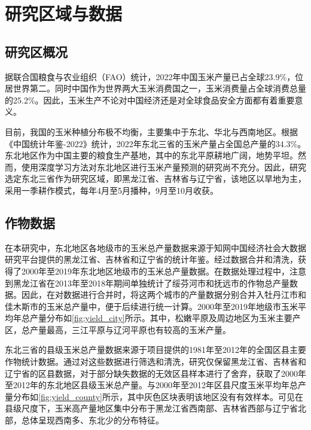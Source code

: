 \cleardoublepage

\section{研究区域与数据}
\subsection{研究区概况}
\par 据联合国粮食与农业组织（FAO）\cite{FAO2022}统计，2022年中国玉米产量已占全球23.9\%，位居世界第二。同时中国作为世界两大玉米消费国之一，玉米消费量占全球消费总量的25.2\%。因此，玉米生产不论对中国经济还是对全球食品安全方面都有着重要意义。
\par 目前，我国的玉米种植分布极不均衡，主要集中于东北、华北与西南地区。根据《中国统计年鉴-2022》\cite{国家统计局2022中国统计年鉴}统计，2022年东北三省的玉米产量占全国总产量的34.3\%。东北地区作为中国主要的粮食生产基地，其中的东北平原耕地广阔，地势平坦。然而，使用深度学习方法对东北地区进行玉米产量预测的研究尚不充分。因此，研究选定东北三省作为研究区域，即黑龙江省、吉林省与辽宁省，该地区以旱地为主，采用一季耕作模式，每年4月至5月播种，9月至10月收获。

\subsection{作物数据}
\par 在本研究中，东北地区各地级市的玉米总产量数据来源于知网中国经济社会大数据研究平台\cite{中国经济社会大数据研究平台}提供的黑龙江省、吉林省和辽宁省的统计年鉴。经过数据合并和清洗，获得了2000年至2019年东北地区地级市的玉米总产量数据。在数据处理过程中，注意到黑龙江省在2013年至2018年期间单独统计了绥芬河市和抚远市的作物总产量数据。因此，在对数据进行合并时，将这两个城市的产量数据分别合并入牡丹江市和佳木斯市的玉米总产量中，便于后续进行统一计算。2000年至2019年地级市玉米平均年总产量分布如\autoref{fig:yield_city}所示。其中，松嫩平原及周边地区为玉米主要产区，总产量最高，三江平原与辽河平原也有较高的玉米产量。

\par 东北三省的县级玉米总产量数据来源于项目提供的1981年至2012年的全国区县主要作物统计数据。通过对这些数据进行筛选和清洗，研究仅保留黑龙江省、吉林省和辽宁省的区县数据，对于部分缺失数据的无效区县样本进行了舍弃，获取了2000年至2012年的东北地区县级玉米总产量。与2000年至2012年区县尺度玉米平均年总产量分布如\autoref{fig:yield_county}所示，其中灰色区块表明该地区没有有效样本。可见在县级尺度下，玉米高产量地区集中分布于黑龙江省西南部、吉林省西部与辽宁省北部，总体呈现西南多、东北少的分布特征。

